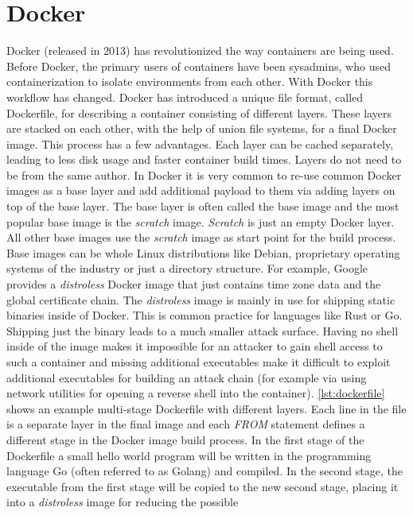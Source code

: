 \documentclass[titlepage]{report}
\begin{document}
\section{Docker}
Docker (released in 2013\cite{DockerRelease}) has revolutionized the way containers are being used.
Before Docker, the primary users of containers have been sysadmins, who used containerization to isolate environments from each other. With Docker
this workflow has changed. Docker has introduced a unique file format, called Dockerfile, for describing a container consisting of different layers. These layers
are stacked on each other, with the help of union file systems, for a final Docker image. This process has a few advantages. Each layer can be cached separately, leading
to less disk usage and faster container build times. Layers do not need to be from the same author. In Docker it is very common to re-use common Docker images
as a base layer and add additional payload to them via adding layers on top of the base layer. The base layer is often called the base image and the most popular
base image is the \emph{scratch} image. \emph{Scratch} is just an empty Docker layer. All other base images use the \emph{scratch} image as start point for the build process.
Base images can be whole Linux distributions like Debian, proprietary operating systems of the industry or just a directory structure. For example, Google provides
a \emph{distroless} Docker image that just contains time zone data and the global certificate chain\cite{Distroless}. The \emph{distroless} image is mainly in use for shipping
static binaries inside of Docker. This is common practice for languages like Rust or Go. Shipping just the binary leads to a much smaller attack surface. Having no shell inside
of the image makes it impossible for an attacker to gain shell access to such a container and missing additional executables make it difficult to
exploit additional executables for building an attack chain (for example via using network utilities for opening a reverse shell into the container).
\autoref{lst:dockerfile} shows an example multi-stage Dockerfile with different layers. Each line in the file is a separate layer in the final image
and each \emph{FROM} statement defines a different stage in the Docker image build process. In the first stage of the Dockerfile
a small hello world program will be written in the programming language Go (often referred to as Golang) and compiled. In the second stage,
the executable from the first stage will be copied to the new second stage, placing it into a \emph{distroless} image for reducing the possible
\end{document}
